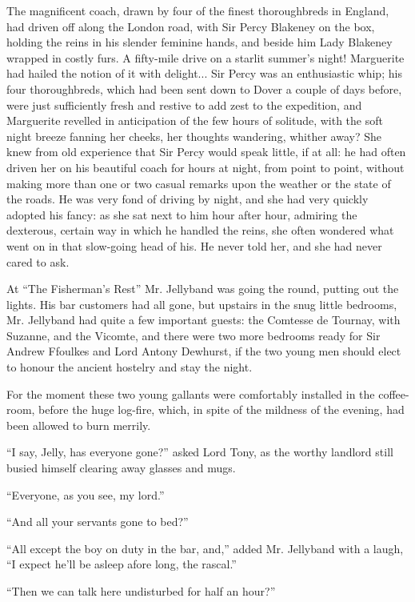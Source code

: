 \documentclass[paper=a5,BCOR=7mm,twoside,DIV=calc,12pt,usegeometry,chapterprefix,endperiod,headings=big]{scrbook}
\begin{document}
The magnificent coach, drawn by four of the finest thoroughbreds in England, had driven off along the London road, with Sir Percy Blakeney on the box, holding the reins in his slender feminine hands, and beside him Lady Blakeney wrapped in costly furs. A fifty-mile drive on a starlit summer's night! Marguerite had hailed the notion of it with delight... Sir Percy was an enthusiastic whip; his four thoroughbreds, which had been sent down to Dover a couple of days before, were just sufficiently fresh and restive to add zest to the expedition, and Marguerite revelled in anticipation of the few hours of solitude, with the soft night breeze fanning her cheeks, her thoughts wandering, whither away? She knew from old experience that Sir Percy would speak little, if at all: he had often driven her on his beautiful coach for hours at night, from point to point, without making more than one or two casual remarks upon the weather or the state of the roads. He was very fond of driving by night, and she had very quickly adopted his fancy: as she sat next to him hour after hour, admiring the dexterous, certain way in which he handled the reins, she often wondered what went on in that slow-going head of his. He never told her, and she had never cared to ask.

At \enquote{The Fisherman's Rest} Mr. Jellyband was going the round, putting out the lights. His bar customers had all gone, but upstairs in the snug little bedrooms, Mr. Jellyband had quite a few important guests: the Comtesse de Tournay, with Suzanne, and the Vicomte, and there were two more bedrooms ready for Sir Andrew Ffoulkes and Lord Antony Dewhurst, if the two young men should elect to honour the ancient hostelry and stay the night.

For the moment these two young gallants were comfortably installed in the coffee-room, before the huge log-fire, which, in spite of the mildness of the evening, had been allowed to burn merrily.

\enquote{I say, Jelly, has everyone gone?} asked Lord Tony, as the worthy landlord still busied himself clearing away glasses and mugs.

\enquote{Everyone, as you see, my lord.}

\enquote{And all your servants gone to bed?}

\enquote{All except the boy on duty in the bar, and,} added Mr. Jellyband with a laugh, \enquote{I expect he'll be asleep afore long, the rascal.}

\enquote{Then we can talk here undisturbed for half an hour?}
\end{document}
